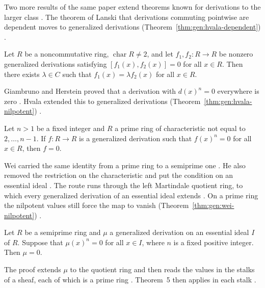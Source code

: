 Two more results of the same paper extend theorems known for derivations to
the larger class \cite[pp.~1148, 1153, 1159]{Hvala1998}. The theorem of
Lanski that derivations commuting pointwise are dependent moves to
generalized derivations (Theorem~\ref{thm:gen:hvala-dependent}) \cite[p.~1148]{Hvala1998}.

\begin{theorem}\label{thm:gen:hvala-dependent}
Let $R$ be a noncommutative ring, $\operatorname{char}R\neq 2$, and let
$f_{1},f_{2}\colon R\to R$ be nonzero generalized derivations satisfying
$[f_{1}(x),f_{2}(x)]=0$ for all $x\in R$. Then there exists $\lambda\in C$
such that $f_{1}(x)=\lambda f_{2}(x)$ for all $x\in R$.
\end{theorem}

Giambruno and Herstein proved that a derivation with $d(x)^{n}=0$ everywhere
is zero \cite{GiambrunoHerstein1981}. Hvala extended this to generalized
derivations (Theorem~\ref{thm:gen:hvala-nilpotent}) \cite[p.~1148]{Hvala1998}.

\begin{theorem}\label{thm:gen:hvala-nilpotent}
Let $n>1$ be a fixed integer and $R$ a prime ring of characteristic not
equal to $2,\dots,n-1$. If $f\colon R\to R$ is a generalized derivation such
that $f(x)^{n}=0$ for all $x\in R$, then $f=0$.
\end{theorem}

Wei carried the same identity from a prime ring to a semiprime one
\cite[p.~453]{Wei2004}. He also removed the restriction on the characteristic and
put the condition on an essential ideal \cite[p.~453]{Wei2004}. The route runs
through the left Martindale quotient ring, to which every generalized derivation
of an essential ideal extends \cite[Theorem~2, p.~455]{Wei2004}. On a prime ring
the nilpotent values still force the map to vanish (Theorem~\ref{thm:gen:wei-nilpotent})
\cite[Theorem~5, p.~457]{Wei2004}.\begin{theorem}\label{thm:gen:wei-nilpotent}
Let $R$ be a semiprime ring and $\mu$ a generalized derivation on an essential
ideal $I$ of $R$. Suppose that $\mu(x)^{n}=0$ for all $x\in I$, where $n$ is a fixed
positive integer. Then $\mu=0$.
\end{theorem}

The proof extends $\mu$ to the quotient ring and then reads the values in the stalks
of a sheaf, each of which is a prime ring \cite[p.~460]{Wei2004}. Theorem~5 then
applies in each stalk \cite[p.~460]{Wei2004}.

